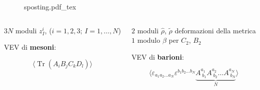 \documentclass[aspectratio=43,mathserif]{beamer}
\newcommand{\tr}{\operatorname{Tr}}
\newcommand{\hatt}[1]{\ensuremath{\widehat{#1}}}
\newcommand{\tildd}[1]{\ensuremath{\widetilde{#1}}}
\begin{document}
\begin{frame}

	\vspace{-12pt}

	\begin{figure}[h!]\centering
	\def\svgscale{0.6}
	{sposting.pdf_tex}
	\end{figure}

	\vspace{-20pt}

	\begin{columns}
		\begin{column}{0.48\textwidth}
			\begin{center}	
				$3N$ moduli {\Large $z_I^i$}, (${\scriptstyle i=1,2,3; \,I = 1,\ldots,N}$)
			\end{center}

			\vfill {\centering VEV di \textbf{mesoni}:\par}
	
	\begin{equation}
		\langle\tr \left( A_i B_j C_k D_l \right)\rangle
		\label{}
	\end{equation}

		\end{column}
		\begin{column}{0.52\textwidth}

			\vspace{-13pt}
			$2$ moduli $\hatt\rho$, $\tildd\rho$ deformazioni della metrica\\
			
			\vspace{10pt} $1$ modulo $\beta$ per $C_2$, $B_2$


			\vspace{10pt}VEV di \textbf{barioni}:

			\vspace{-13pt}
	\begin{equation}
	\langle	\varepsilon_{a_1 a_2 \ldots a_N} \varepsilon^{b_1 b_2 \ldots b_N} \underbrace{A^{a_1}_{\;b_1} A^{a_2}_{\;b_2} \ldots A^{a_N}_{\;b_N} }_{N}\rangle
	\end{equation}



		\end{column}\end{columns}



\end{frame}
\end{document}
